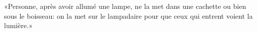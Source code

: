 \encetemps \jesusdisciples
	«Personne, après avoir allumé une lampe,
		ne la met dans une cachette ou bien sous le boisseau:
	on la met sur le lampadaire pour que ceux qui entrent voient la lumière.»
